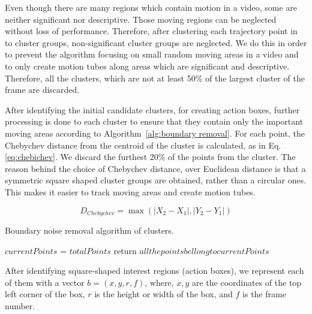 Even though there are many regions which contain motion in a video, some are neither significant nor descriptive.
Those moving regions can be neglected without loss of performance. Therefore, after clustering each trajectory point in to cluster groups,
non-significant cluster groups are neglected.
We do this in order to prevent the algorithm focusing on small random moving areas in a video and to only create motion tubes along areas which are significant and descriptive.
Therefore, all the clusters, which are not at least 50\% of the largest cluster of the frame are discarded.

After identifying the initial candidate clusters, for creating action boxes, further processing is done to each cluster to ensure that they
contain only the important moving areas according to Algorithm~\ref{alg:boundary removal}. For each point, the Chebychev distance from the centroid of the cluster is calculated,
as in
Eq. \ref{eq:chebichev}. We discard the furthest 20\% of the points from the cluster. The reason behind the choice of Chebychev
distance, over Euclidean distance is that a symmetric square shaped cluster groups are obtained, rather than a circular ones. This makes it
easier to track moving areas and create motion tubes.

\begin{equation}\label{eq:chebichev}
 D_{Chebychev} = \max(|X_{2} - X_{1}|,|Y_{2}-Y_{1}|)
\end{equation}

\begin{algorithm*}
   \caption{Boundary noise removal algorithm of clusters.}
   \label{alg:boundary removal}
    \begin{algorithmic}[1]
	\State $currentPoints$ = $totalPoints$
	    \State return $all the points bellong to currentPoints$
	  \EndIf
	
	\EndWhile
     \EndFunction


\end{algorithmic}
\end{algorithm*}

After identifying square-shaped interest regions (action boxes), we represent each of them with a vector $b = (x,y,r,f)$, where, $x,y$ are the coordinates
of the top left corner of the box, $r$ is the height or width of the box, and $f$ is the frame number.


